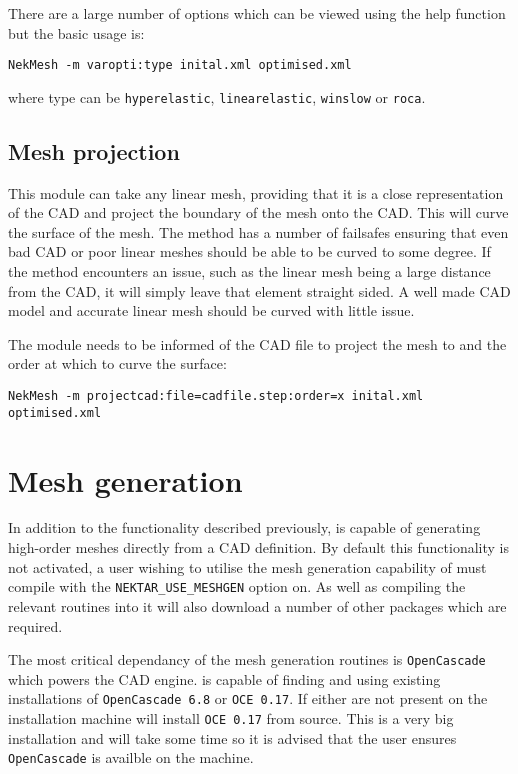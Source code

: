 There are a large number of options which can be viewed using the help function
but the basic usage is:
\begin{lstlisting}[style=BashInputStyle]
  NekMesh -m varopti:type inital.xml optimised.xml
\end{lstlisting}

where type can be \texttt{hyperelastic}, \texttt{linearelastic},
\texttt{winslow} or \texttt{roca}.

\subsection{Mesh projection}
This module can take any linear mesh, providing that it is a close
representation of the CAD and project the boundary of the mesh onto the CAD.
This will curve the surface of the mesh. The method has a number of failsafes
ensuring that even bad CAD or poor linear meshes should be able to be curved to
some degree. If the method encounters an issue, such as the linear mesh being a
large distance from the CAD, it will simply leave that element straight sided. A
well made CAD model and accurate linear mesh should be curved with little issue.

The module needs to be informed of the CAD file to project the mesh to and the
order at which to curve the surface:
\begin{lstlisting}[style=BashInputStyle]
  NekMesh -m projectcad:file=cadfile.step:order=x inital.xml optimised.xml
\end{lstlisting}


\section{Mesh generation}

In addition to the functionality described previously, \nm is capable of
generating high-order meshes directly from a CAD definition. By default this
functionality is not activated, a user wishing to utilise the mesh generation
capability of \nm must compile \nekpp with the \texttt{NEKTAR\_USE\_MESHGEN}
option on. As well as compiling the relevant routines into \nm it will also
download a number of other packages which are required.

The most critical dependancy of the mesh generation routines is
\texttt{OpenCascade} which powers the CAD engine. \nm is capable of finding and
using existing installations of \texttt{OpenCascade 6.8} or \texttt{OCE 0.17}.
If either are not present on the installation machine \nm will install
\texttt{OCE 0.17} from source. This is a very big installation and will take
some time so it is advised that the user ensures \texttt{OpenCascade} is
availble on the machine.

